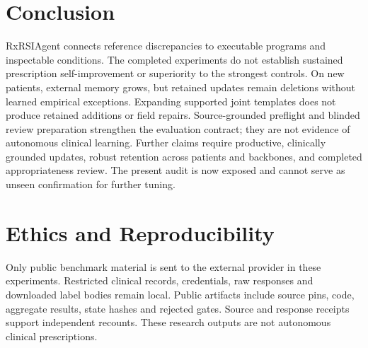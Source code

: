 \section{Conclusion}
RxRSIAgent connects reference discrepancies to executable programs and inspectable conditions. The completed experiments do not establish sustained prescription self-improvement or superiority to the strongest controls. On new patients, external memory grows, but retained updates remain deletions without learned empirical exceptions. Expanding supported joint templates does not produce retained additions or field repairs. Source-grounded preflight and blinded review preparation strengthen the evaluation contract; they are not evidence of autonomous clinical learning. Further claims require productive, clinically grounded updates, robust retention across patients and backbones, and completed appropriateness review. The present audit is now exposed and cannot serve as unseen confirmation for further tuning.

\section*{Ethics and Reproducibility}
Only public benchmark material is sent to the external provider in these experiments. Restricted clinical records, credentials, raw responses and downloaded label bodies remain local. Public artifacts include source pins, code, aggregate results, state hashes and rejected gates. Source and response receipts support independent recounts. These research outputs are not autonomous clinical prescriptions.

